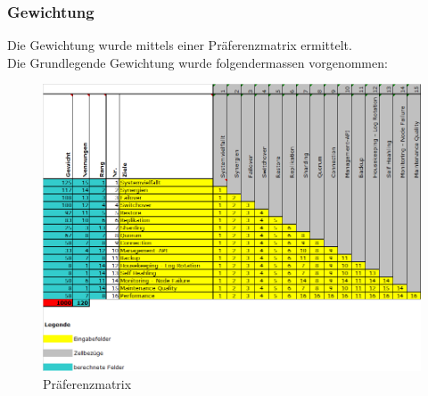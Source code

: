 \subsubsection{Gewichtung}
\begin{flushleft}
    Die Gewichtung wurde mittels einer Präferenzmatrix ermittelt.\\

    Die Grundlegende Gewichtung wurde folgendermassen vorgenommen:
    \begin{figure}[H]
        \centering
        \includegraphics[width=1\linewidth]{source/implementation/evaluation/requirements/preference_matrix}
        \caption{Präferenzmatrix}
        \label{fig:preference_matrix}
    \end{figure}
\end{flushleft}
